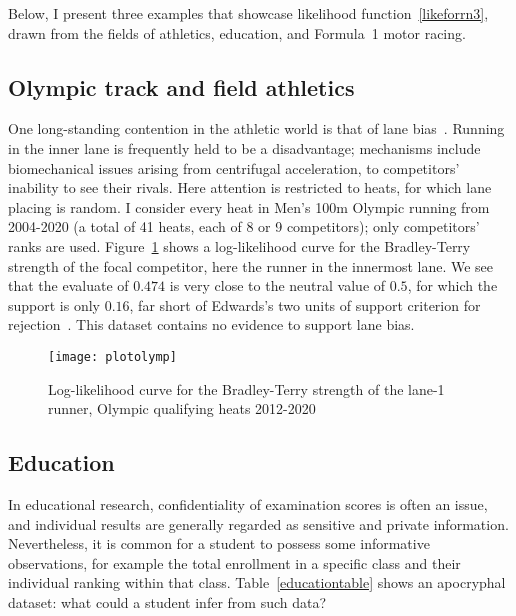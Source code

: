 \documentclass[ejs,noshowframe]{imsart}
\theoremstyle{plain}
\theoremstyle{definition}
\theoremstyle{remark}
\begin{document}
Below, I present three examples that showcase likelihood
function~\ref{likeforrn3}, drawn from the fields of athletics,
education, and Formula~1 motor racing.

\subsection{Olympic track and field athletics}

One long-standing contention in the athletic world is that of lane
bias~\cite{munro2022}.  Running in the inner lane is frequently held
to be a disadvantage; mechanisms include biomechanical issues arising
from centrifugal acceleration, to competitors' inability to see their
rivals.  Here attention is restricted to heats, for which lane placing
is random.  I consider every heat in Men's 100m Olympic running from
2004-2020 (a total of 41 heats, each of 8 or 9 competitors); only
competitors' ranks are used.  Figure~\ref{plotolymp} shows a
log-likelihood curve for the Bradley-Terry strength of the focal
competitor, here the runner in the innermost lane.  We see that the
evaluate of $0.474$ is very close to the neutral value of $0.5$, for
which the support is only $0.16$, far short of Edwards's two units of
support criterion for rejection~\cite{edwards1972}.  This dataset
contains no evidence to support lane bias.

\begin{figure}[t]
\texttt{[image: plotolymp]} %
\caption{Log-likelihood curve for the Bradley-Terry strength of the
  lane-1 runner, Olympic qualifying heats 2012-2020 \label{plotolymp}}
\end{figure}

\subsection{Education}

In educational research, confidentiality of examination scores is
often an issue, and individual results are generally regarded as
sensitive and private information.  Nevertheless, it is common for a
student to possess some informative observations, for example the
total enrollment in a specific class and their individual ranking
within that class.  Table~\ref{educationtable} shows an apocryphal
dataset: what could a student infer from such data?
\end{document}
